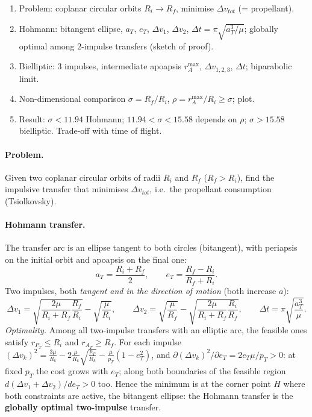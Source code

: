 \begin{outline}
\begin{enumerate}
\item Problem: coplanar circular orbits $R_i\to R_f$, minimise $\Delta v_{tot}$ (= propellant).
\item Hohmann: bitangent ellipse, $a_T$, $e_T$, $\Delta v_1$, $\Delta v_2$, $\Delta t=\pi\sqrt{a_T^3/\mu}$; globally optimal among 2-impulse transfers (sketch of proof).
\item Bielliptic: 3 impulses, intermediate apoapsis $r_A^{\max}$, $\Delta v_{1,2,3}$, $\Delta t$; biparabolic limit.
\item Non-dimensional comparison $\sigma=R_f/R_i$, $\rho=r_A^{\max}/R_i\ge\sigma$; plot.
\item Result: $\sigma<11.94$ Hohmann; $11.94<\sigma<15.58$ depends on $\rho$; $\sigma>15.58$ bielliptic. Trade-off with time of flight.
\end{enumerate}
\end{outline}

\answer
\paragraph{Problem.} Given two coplanar circular orbits of radii $R_i$ and $R_f$ ($R_f>R_i$), find the impulsive transfer that
minimises $\Delta v_{tot}$, i.e.\ the propellant consumption (Tsiolkovsky).

\paragraph{Hohmann transfer.} The transfer arc is an ellipse tangent to both circles (bitangent), with periapsis on the
initial orbit and apoapsis on the final one:
\begin{equation}
a_{T}=\frac{R_{i}+R_{f}}{2},\qquad e_{T}=\frac{R_{f}-R_{i}}{R_{f}+R_{i}} .
\end{equation}
Two impulses, both \emph{tangent and in the direction of motion} (both increase $a$):
\begin{equation}
\Delta v_{1}=\sqrt{\frac{2\mu}{R_{i}+R_{f}}\frac{R_{f}}{R_{i}}}-\sqrt{\frac{\mu}{R_{i}}},\qquad
\Delta v_{2}=\sqrt{\frac{\mu}{R_{f}}}-\sqrt{\frac{2\mu}{R_{i}+R_{f}}\frac{R_{i}}{R_{f}}},\qquad
\Delta t=\pi\sqrt{\frac{a_{T}^{3}}{\mu}} .
\end{equation}
\emph{Optimality.} Among all two-impulse transfers with an elliptic arc, the feasible ones satisfy $r_{P_T}\le R_i$ and
$r_{A_T}\ge R_f$. For each impulse
$(\Delta v_k)^2=\frac{3\mu}{R_k}-2\frac{\mu}{R_k}\sqrt{\frac{p_T}{R_k}}-\frac{\mu}{p_T}(1-e_T^2)$, and
$\partial(\Delta v_k)^2/\partial e_T=2e_T\mu/p_T>0$: at fixed $p_T$ the cost grows with $e_T$; along both boundaries of the
feasible region $d(\Delta v_1+\Delta v_2)/de_T>0$ too. Hence the minimum is at the corner point $H$ where both constraints
are active, the bitangent ellipse: the Hohmann transfer is the \textbf{globally optimal two-impulse} transfer.

